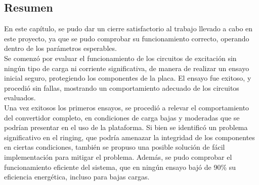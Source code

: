 \subsection{Resumen}

En este capítulo, se pudo dar un cierre satisfactorio al trabajo llevado a cabo en este proyecto, ya que se pudo comprobar su funcionamiento correcto, operando dentro de los parámetros esperables.\\

Se comenzó por evaluar el funcionamiento de los circuitos de excitación sin ningún tipo de carga ni corriente significativa, de manera de realizar un ensayo inicial seguro, protegiendo los componentes de la placa. El ensayo fue exitoso, y procedió sin fallas, mostrando un comportamiento adecuado de los circuitos evaluados.\\

Una vez exitosos los primeros ensayos, se procedió a relevar el comportamiento del convertidor completo, en condiciones de carga bajas y moderadas que se podrían presentar en el uso de la plataforma. Si bien se identificó un problema significativo en el ringing, que podría amenazar la integridad de los componentes en ciertas condiciones, también se propuso una posible solución de fácil implementación para mitigar el problema. Además, se pudo comprobar el funcionamiento eficiente del sistema, que en ningún ensayo bajó de 90\% su eficiencia energética, incluso para bajas cargas.\\